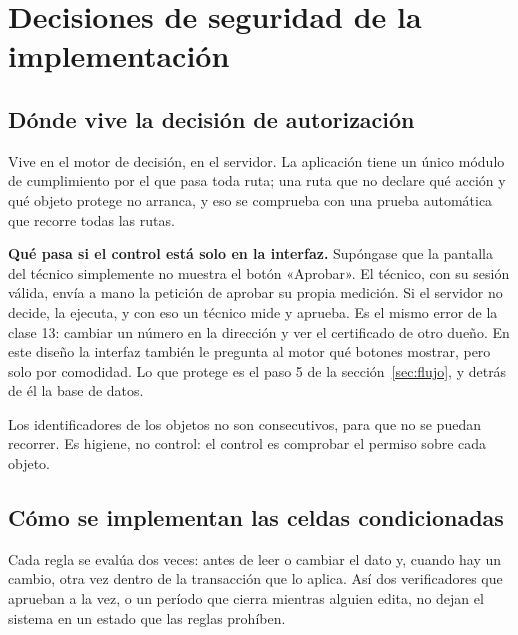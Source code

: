 \documentclass[11pt,letterpaper]{article}
\begin{document}
\section{Decisiones de seguridad de la implementación}
\label{sec:decisiones}

\subsection{Dónde vive la decisión de autorización}

Vive en el motor de decisión, en el servidor. La aplicación tiene un único módulo de cumplimiento por
el que pasa toda ruta; una ruta que no declare qué acción y qué objeto protege no arranca, y eso se
comprueba con una prueba automática que recorre todas las rutas.

\textbf{Qué pasa si el control está solo en la interfaz.} Supóngase que la pantalla del técnico
simplemente no muestra el botón «Aprobar». El técnico, con su sesión válida, envía a mano la petición
de aprobar su propia medición. Si el servidor no decide, la ejecuta, y con eso un técnico mide y
aprueba. Es el mismo error de la clase 13: cambiar un número en la dirección y ver el certificado de
otro dueño. En este diseño la interfaz también le pregunta al motor qué botones mostrar, pero solo por
comodidad. Lo que protege es el paso 5 de la sección~\ref{sec:flujo}, y detrás de él la base de datos.

Los identificadores de los objetos no son consecutivos, para que no se puedan recorrer. Es higiene, no
control: el control es comprobar el permiso sobre cada objeto.

\subsection{Cómo se implementan las celdas condicionadas}

Cada regla se evalúa dos veces: antes de leer o cambiar el dato y, cuando hay un cambio, otra vez
dentro de la transacción que lo aplica. Así dos verificadores que aprueban a la vez, o un período que
cierra mientras alguien edita, no dejan el sistema en un estado que las reglas prohíben.
\end{document}
